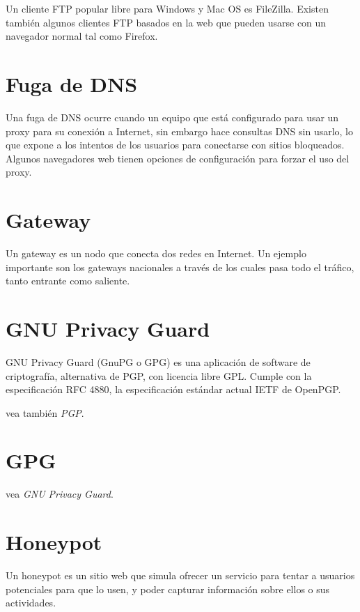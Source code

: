 \documentclass[10pt,a5paper,twoside,,]{book}
\begin{document}
Un cliente FTP popular libre para Windows y Mac OS es FileZilla. Existen
también algunos clientes FTP basados en la web que pueden usarse con un
navegador normal tal como Firefox.

\section{Fuga de DNS}\label{fuga-de-dns}

Una fuga de DNS ocurre cuando un equipo que está configurado para usar
un proxy para su conexión a Internet, sin embargo hace consultas DNS sin
usarlo, lo que expone a los intentos de los usuarios para conectarse con
sitios bloqueados. Algunos navegadores web tienen opciones de
configuración para forzar el uso del proxy.

\section{Gateway}\label{gateway}

Un gateway es un nodo que conecta dos redes en Internet. Un ejemplo
importante son los gateways nacionales a través de los cuales pasa todo
el tráfico, tanto entrante como saliente.

\section{GNU Privacy Guard}\label{gnu-privacy-guard}

GNU Privacy Guard (GnuPG o GPG) es una aplicación de software de
criptografía, alternativa de PGP, con licencia libre GPL. Cumple con la
especificación RFC 4880, la especificación estándar actual IETF de
OpenPGP.

vea también \emph{PGP}.

\section{GPG}\label{gpg}

vea \emph{GNU Privacy Guard}.

\section{Honeypot}\label{honeypot}

Un honeypot es un sitio web que simula ofrecer un servicio para tentar a
usuarios potenciales para que lo usen, y poder capturar información
sobre ellos o sus actividades.
\end{document}
